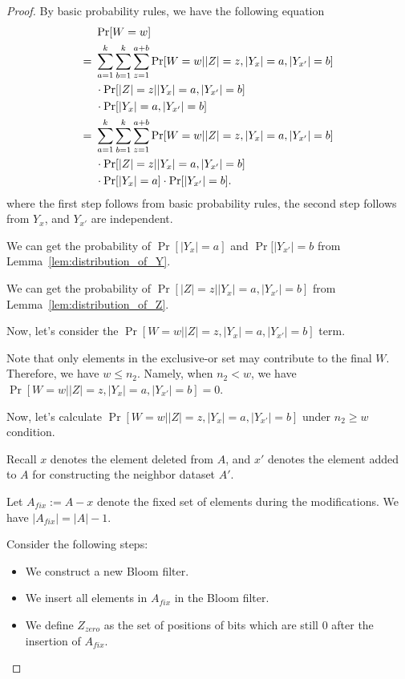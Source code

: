 \begin{proof}

By basic probability rules, we have the following equation
\begin{align*}
    & ~\Pr[W = w] \notag \\
    =& ~ \sum_{a = 1}^k \sum_{b = 1}^k \sum_{z = 1}^{a+b} \Pr[W = w | |Z| = z, |Y_x| = a, |Y_{x'}| = b] \notag \\
    & ~ \cdot \Pr[|Z| = z | |Y_x| = a, |Y_{x'}| = b] \\
    & ~ \cdot \Pr[|Y_x| = a, |Y_{x'}| = b] \notag \\
    =& ~ \sum_{a = 1}^k \sum_{b = 1}^k \sum_{z = 1}^{a+b} \Pr[W = w | |Z| = z, |Y_x| = a, |Y_{x'}| = b] \notag \\
    & ~ \cdot \Pr[|Z| = z | |Y_x| = a, |Y_{x'}| = b] \\
    & ~ \cdot \Pr[|Y_x| = a] \cdot \Pr[|Y_{x'}| = b].
\end{align*}
where the first step follows from basic probability rules, the second step follows from $Y_x$, and $Y_{x'}$ are independent. 

We can get the probability of $\Pr[|Y_x| = a]$ and $\Pr[|Y_{x'}| = b$ from Lemma~\ref{lem:distribution_of_Y}. 

We can get the probability of $\Pr[|Z| = z | |Y_x| = a, |Y_{x'}| = b]$ from Lemma~\ref{lem:distribution_of_Z}. 

Now, let's consider the $\Pr[W = w | |Z| = z, |Y_x| = a, |Y_{x'}| = b]$ term. 

Note that only elements in the exclusive-or set may contribute to the final $W$. Therefore, we have $w \leq n_2$. Namely, when $n_2 < w$, we have $\Pr[W = w | |Z| = z, |Y_x| = a, |Y_{x'}| = b] = 0$. 

Now, let's calculate $\Pr[W = w | |Z| = z, |Y_x| = a, |Y_{x'}| = b]$ under $n_2 \geq w$ condition. 

Recall $x$ denotes the element deleted from $A$, and $x'$ denotes the element added to $A$ for constructing the neighbor dataset $A'$. 

Let $A_{fix} := A - x$ denote the fixed set of elements during the modifications. We have $|A_{fix}| = |A| - 1$. 

Consider the following steps:
\begin{itemize}
    \item We construct a new Bloom filter.
    \item We insert all elements in $A_{fix}$ in the Bloom filter.
    \item We define $Z_{zero}$ as the set of positions of bits which are still $0$ after the insertion of $A_{fix}$.
\end{itemize}


\end{proof}
